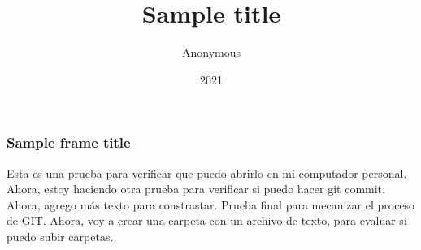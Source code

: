 \documentclass{beamer}
\title{Sample title}
\author{Anonymous}
\institute{Overleaf}
\date{2021}
\begin{document}
\frame{\titlepage}    

\begin{frame}
\frametitle{Sample frame title}
Esta es una prueba para verificar que puedo abrirlo en mi computador personal. Ahora, estoy haciendo otra prueba para verificar si puedo hacer git commit. Ahora, agrego más texto para constrastar. Prueba final para mecanizar el proceso de GIT. Ahora, voy a crear una carpeta con un archivo de texto, para evaluar si puedo subir carpetas. 
\end{frame}
\end{document}
